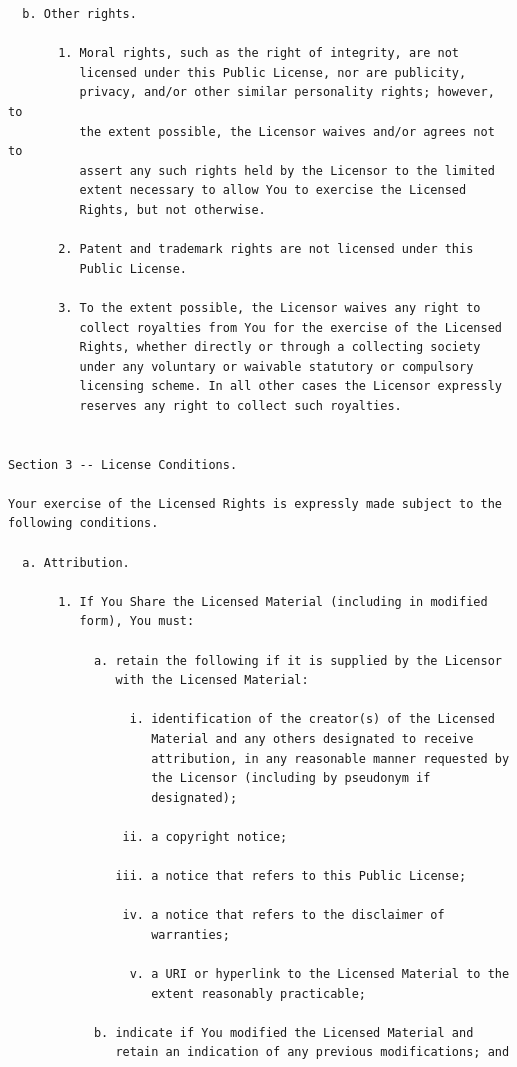 \documentclass[12pt,spanish,]{scrartcl}
\begin{document}
\begin{verbatim}
  b. Other rights.

       1. Moral rights, such as the right of integrity, are not
          licensed under this Public License, nor are publicity,
          privacy, and/or other similar personality rights; however, to
          the extent possible, the Licensor waives and/or agrees not to
          assert any such rights held by the Licensor to the limited
          extent necessary to allow You to exercise the Licensed
          Rights, but not otherwise.

       2. Patent and trademark rights are not licensed under this
          Public License.

       3. To the extent possible, the Licensor waives any right to
          collect royalties from You for the exercise of the Licensed
          Rights, whether directly or through a collecting society
          under any voluntary or waivable statutory or compulsory
          licensing scheme. In all other cases the Licensor expressly
          reserves any right to collect such royalties.


Section 3 -- License Conditions.

Your exercise of the Licensed Rights is expressly made subject to the
following conditions.

  a. Attribution.

       1. If You Share the Licensed Material (including in modified
          form), You must:

            a. retain the following if it is supplied by the Licensor
               with the Licensed Material:

                 i. identification of the creator(s) of the Licensed
                    Material and any others designated to receive
                    attribution, in any reasonable manner requested by
                    the Licensor (including by pseudonym if
                    designated);

                ii. a copyright notice;

               iii. a notice that refers to this Public License;

                iv. a notice that refers to the disclaimer of
                    warranties;

                 v. a URI or hyperlink to the Licensed Material to the
                    extent reasonably practicable;

            b. indicate if You modified the Licensed Material and
               retain an indication of any previous modifications; and


\end{verbatim}
\end{document}
